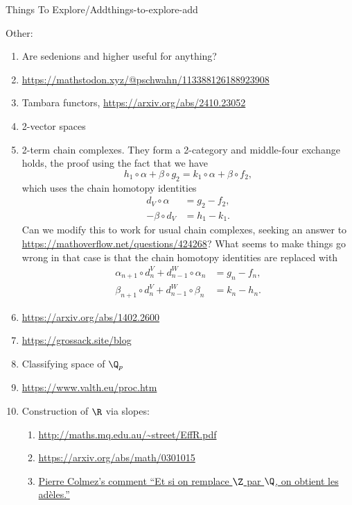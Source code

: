 \begin{remark}{Things To Explore/Add}{things-to-explore-add}
\begin{enumerate}
    \end{enumerate}
    Other:
    \begin{enumerate}
        \item Are sedenions and higher useful for anything?
        \item \url{https://mathstodon.xyz/@pschwahn/113388126188923908}
        \item Tambara functors, \url{https://arxiv.org/abs/2410.23052}
        \item 2-vector spaces
        \item 2-term chain complexes. They form a 2-category and middle-four exchange holds, the proof using the fact that we have
            \[
                h_{1}\circ\alpha+\beta\circ g_{2}%
                =%
                k_{1}\circ\alpha+\beta\circ f_{2},%
            \]%
            which uses the chain homotopy identities
            \begin{align*}
                d_{V}\circ\alpha  &= g_{2}-f_{2},\\
                -\beta\circ d_{V} &= h_{1}-k_{1}.
            \end{align*}
            Can we modify this to work for usual chain complexes, seeking an answer to \url{https://mathoverflow.net/questions/424268}? What seems to make things go wrong in that case is that the chain homotopy identities are replaced with
            \begin{align*}
                \alpha_{n+1}\circ d^{V}_{n}+d^{W}_{n-1}\circ\alpha_{n} &= g_{n}-f_{n},\\
                \beta_{n+1}\circ d^{V}_{n}+d^{W}_{n-1}\circ\beta_{n}   &= k_{n}-h_{n}.
            \end{align*}
        \item \url{https://arxiv.org/abs/1402.2600}
        \item \url{https://grossack.site/blog}
        \item Classifying space of $\Q_{p}$
        \item \url{https://www.valth.eu/proc.htm}
        \item Construction of $\R$ via slopes:
            \begin{enumerate}
                \item \url{http://maths.mq.edu.au/~street/EffR.pdf}
                \item \url{https://arxiv.org/abs/math/0301015}
                \item \href{https://twitter.com/ColmezPierre/status/1809308351643165181?t=KAESWH44ufE7486diGcxrA}{Pierre Colmez's comment ``Et si on remplace $\Z$ par $\Q$, on obtient les adèles.''}

\end{enumerate}
\end{enumerate}
\end{remark}
